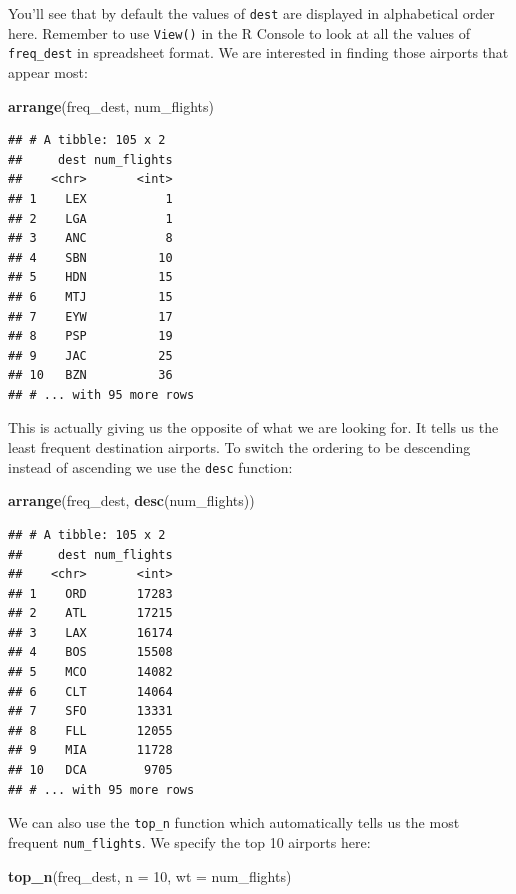 \documentclass[]{tufte-book}
\newenvironment{Shaded}{\begin{snugshade}}{\end{snugshade}}
\newcommand{\KeywordTok}[1]{\textcolor[rgb]{0.13,0.29,0.53}{\textbf{{#1}}}}
\newcommand{\DataTypeTok}[1]{\textcolor[rgb]{0.13,0.29,0.53}{{#1}}}
\newcommand{\DecValTok}[1]{\textcolor[rgb]{0.00,0.00,0.81}{{#1}}}
\newcommand{\NormalTok}[1]{{#1}}
\begin{document}
You'll see that by default the values of \texttt{dest} are displayed in
alphabetical order here. Remember to use \texttt{View()} in the R
Console to look at all the values of \texttt{freq\_dest} in spreadsheet
format. We are interested in finding those airports that appear most:

\begin{Shaded}
\begin{Highlighting}[]
\KeywordTok{arrange}\NormalTok{(freq_dest, num_flights)}
\end{Highlighting}
\end{Shaded}

\begin{verbatim}
## # A tibble: 105 x 2
##     dest num_flights
##    <chr>       <int>
## 1    LEX           1
## 2    LGA           1
## 3    ANC           8
## 4    SBN          10
## 5    HDN          15
## 6    MTJ          15
## 7    EYW          17
## 8    PSP          19
## 9    JAC          25
## 10   BZN          36
## # ... with 95 more rows
\end{verbatim}

This is actually giving us the opposite of what we are looking for. It
tells us the least frequent destination airports. To switch the ordering
to be descending instead of ascending we use the \texttt{desc} function:

\begin{Shaded}
\begin{Highlighting}[]
\KeywordTok{arrange}\NormalTok{(freq_dest, }\KeywordTok{desc}\NormalTok{(num_flights))}
\end{Highlighting}
\end{Shaded}

\begin{verbatim}
## # A tibble: 105 x 2
##     dest num_flights
##    <chr>       <int>
## 1    ORD       17283
## 2    ATL       17215
## 3    LAX       16174
## 4    BOS       15508
## 5    MCO       14082
## 6    CLT       14064
## 7    SFO       13331
## 8    FLL       12055
## 9    MIA       11728
## 10   DCA        9705
## # ... with 95 more rows
\end{verbatim}

We can also use the \texttt{top\_n} function which automatically tells
us the most frequent \texttt{num\_flights}. We specify the top 10
airports here:

\begin{Shaded}
\begin{Highlighting}[]
\KeywordTok{top_n}\NormalTok{(freq_dest, }\DataTypeTok{n =} \DecValTok{10}\NormalTok{, }\DataTypeTok{wt =} \NormalTok{num_flights)}
\end{Highlighting}
\end{Shaded}
\end{document}

